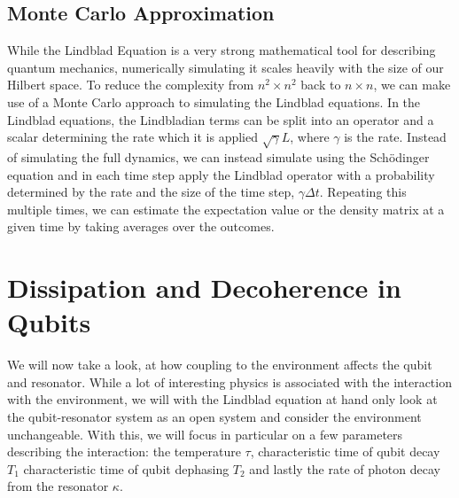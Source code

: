 \subsection{Monte Carlo Approximation}\label{sec:monte_carlo}
While the Lindblad Equation is a very strong mathematical tool for describing quantum mechanics, numerically simulating it scales heavily with the size of our Hilbert space. To reduce the complexity from $n^2\times n^2$ back to $n \times n$, we can make use of a Monte Carlo approach to simulating the Lindblad equations. In the Lindblad equations, the Lindbladian terms can be split into an operator and a scalar determining the rate which it is applied $\sqrt{\gamma}L$, where $\gamma$ is the rate. Instead of simulating the full dynamics, we can instead simulate using the Schödinger equation and in each time step apply the Lindblad operator with a probability determined by the rate and the size of the time step, $\gamma \Delta t$. Repeating this multiple times, we can estimate the expectation value or the density matrix at a given time by taking averages over the outcomes\cite{johansson_qutip_2012}. 



\section{Dissipation and Decoherence in Qubits} \label{sec:qubit_lindblad}
We will now take a look, at how coupling to the environment affects the qubit and resonator. While a lot of interesting physics is associated with the interaction with the environment, we will with the Lindblad equation at hand only look at the qubit-resonator system as an open system and consider the environment unchangeable. With this, we will focus in particular on a few parameters describing the interaction: the temperature $\tau$, characteristic time of qubit decay $T_1$ characteristic time of qubit dephasing $T_2$ and lastly the rate of photon decay from the resonator $\kappa$.

